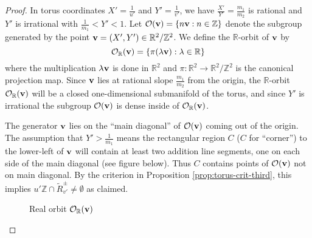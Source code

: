\documentclass[12pt,letterpaper, reqno]{amsart}
\theoremstyle{definition}
\theoremstyle{remark}
\newcommand{\RR}{\ensuremath{\mathbb{R}}}
\newcommand{\ZZ}{\ensuremath{\mathbb{Z}}}
\newcommand{\uu}{{u'}}
\newcommand{\vv}{{v'}}
\newcommand{\bv}{{\bf v}}
\newcommand{\sO}{{\mathcal O}}
\begin{document}
\begin{proof}
In torus coordinates $X' = \frac1{\uu}$ and $Y' = \frac1{\vv}$, we have $\frac{X'}{Y'} = \frac{m_1}{m_2}$ is rational and $Y'$ is irrational with $\frac1{m_1} < Y' < 1$.
Let $\sO(\bv) = \{ n\bv : n\in\ZZ\}$ denote the subgroup generated by the point $\bv = (X',Y')\in \RR^2/\ZZ^2$. 
We define the $\RR$-orbit of $\bv$ by
\[ \sO_{\RR}(\bv) = \{\pi(\lambda \bv) : \lambda\in \RR \}\]
where the multiplication $\lambda\bv$ is done in $\RR^2$ and $\pi:\RR^2 \to \RR^2/\ZZ^2$ is the canonical projection map.
Since $\bv$ lies at rational slope $\frac{m_1}{m_2}$ from the origin, the $\RR$-orbit $\sO_\RR(\bv)$ will be a closed one-dimensional submanifold of the torus, 
and since $Y'$ is irrational the subgroup $\sO(\bv)$ is dense  inside of $\sO_\RR(\bv)$.

The generator $\bv$ lies on the ``main diagonal'' of $\sO(\bv)$ coming out of the origin. The assumption that $Y' > \frac1{m_1}$ means the rectangular region $C$  ($C$ for ``corner'')
to the lower-left of $\bv$ will contain at least two addition line segments, one on each side of the main diagonal (see figure below). Thus $C$ contains points of $\sO(\bv)$ not on main diagonal. By the criterion in Proposition \ref{prop:torus-crit-third}, this implies $\uu\ZZ \cap \widetilde{R}^\pm_\vv \neq \emptyset$ as claimed.

\begin{figure}[h]
\begin{center}
\end{center}
\caption{Real orbit $\sO_\RR(\bv)$}
\end{figure}
\end{proof}
\end{document}
